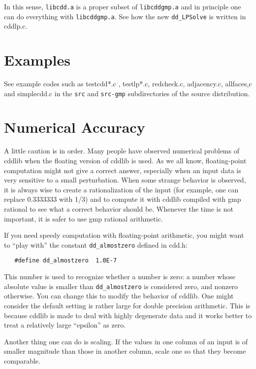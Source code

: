 \documentclass[11pt]{article}
\newcommand {\0} {{\bf 0}}
\begin{document}
In this sense,  {\tt libcdd.a} is a proper subset of  {\tt libcddgmp.a} and in principle one can
do everything with  {\tt libcddgmp.a}.   See how the new {\tt dd\_LPSolve} is written in
cddlp.c.


\section{Examples}  \label{EXAMPLES}

See example codes such as testcdd*.c , testlp*.c, redcheck.c, adjacency.c, allfaces,c
and simplecdd.c 
in the {\tt src} and {\tt src-gmp} subdirectories of the source
distribution.

\section{Numerical Accuracy}  \label{accuracy}
 A little caution is in order.  Many people have observed 
numerical problems of cddlib when the floating version of cddlib
is used.   As we all know, floating-point computation
might not give a correct answer, especially when an input
data is very sensitive to a small perturbation.  When
some strange behavior is observed, it is always wise
to create a rationalization of the input
(for example, one can replace 0.3333333 with 1/3)
and to compute it with cddlib compiled with gmp rational
to see what a correct behavior should be.  Whenever the time
is not important, it is safer to use gmp rational arithmetic.

If you need speedy computation with floating-point arithmetic,
you might want to ``play with'' the constant {\tt dd\_almostzero} 
defined in cdd.h:

\begin{verbatim}
   #define dd_almostzero  1.0E-7
\end{verbatim}
\noindent
This number is used to recognize whether a number is zero:  
a number whose absolute value is smaller
than {\tt dd\_almostzero} is considered zero, and nonzero otherwise.
You can change this to modify the behavior of cddlib.  One might
consider the default setting is rather large for double
precision arithmetic.  This is because cddlib is made
to deal with highly degenerate data and it works better
to treat a relatively large ``epsilon'' as zero.

Another thing one can do is scaling.  If the values in one column of
an input is of smaller magnitude than those in another column, 
scale one so that they become comparable.
\end{document}
